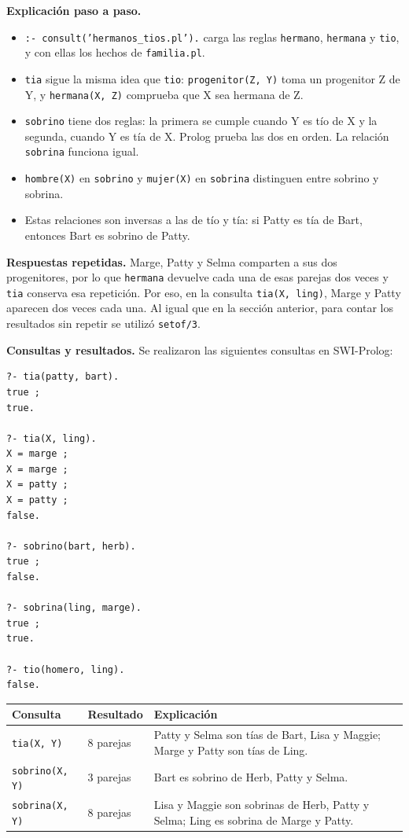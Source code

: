\documentclass[12pt,letterpaper]{article}
\begin{document}
\noindent\textbf{Explicación paso a paso.}
\begin{itemize}
  \item \texttt{:- consult('hermanos\_tios.pl').} carga las reglas
  \texttt{hermano}, \texttt{hermana} y \texttt{tio}, y con ellas los hechos de
  \texttt{familia.pl}.
  \item \texttt{tia} sigue la misma idea que \texttt{tio}: \texttt{progenitor(Z, Y)}
  toma un progenitor Z de Y, y \texttt{hermana(X, Z)} comprueba que X sea hermana
  de Z.
  \item \texttt{sobrino} tiene dos reglas: la primera se cumple cuando Y es tío de X
  y la segunda, cuando Y es tía de X. Prolog prueba las dos en orden. La relación
  \texttt{sobrina} funciona igual.
  \item \texttt{hombre(X)} en \texttt{sobrino} y \texttt{mujer(X)} en
  \texttt{sobrina} distinguen entre sobrino y sobrina.
  \item Estas relaciones son inversas a las de tío y tía: si Patty es tía de Bart,
  entonces Bart es sobrino de Patty.
\end{itemize}

\noindent\textbf{Respuestas repetidas.} Marge, Patty y Selma comparten a sus dos
progenitores, por lo que \texttt{hermana} devuelve cada una de esas parejas dos
veces y \texttt{tia} conserva esa repetición. Por eso, en la consulta
\texttt{tia(X, ling)}, Marge y Patty aparecen dos veces cada una. Al igual que en
la sección anterior, para contar los resultados sin repetir se utilizó
\texttt{setof/3}.

\noindent\textbf{Consultas y resultados.} Se realizaron las siguientes consultas en
SWI-Prolog:

\begin{lstlisting}
?- tia(patty, bart).
true ;
true.

?- tia(X, ling).
X = marge ;
X = marge ;
X = patty ;
X = patty ;
false.

?- sobrino(bart, herb).
true ;
false.

?- sobrina(ling, marge).
true ;
true.

?- tio(homero, ling).
false.
\end{lstlisting}

\begin{center}
\begin{tabular}{|p{4cm}|p{2.2cm}|p{6cm}|}
\hline
\textbf{Consulta} & \textbf{Resultado} & \textbf{Explicación} \\
\hline
\texttt{tia(X, Y)} & 8 parejas & Patty y Selma son tías de Bart, Lisa y Maggie;
Marge y Patty son tías de Ling. \\
\hline
\texttt{sobrino(X, Y)} & 3 parejas & Bart es sobrino de Herb, Patty y Selma. \\
\hline
\texttt{sobrina(X, Y)} & 8 parejas & Lisa y Maggie son sobrinas de Herb, Patty y
Selma; Ling es sobrina de Marge y Patty. \\
\hline
\end{tabular}
\end{center}
\end{document}

